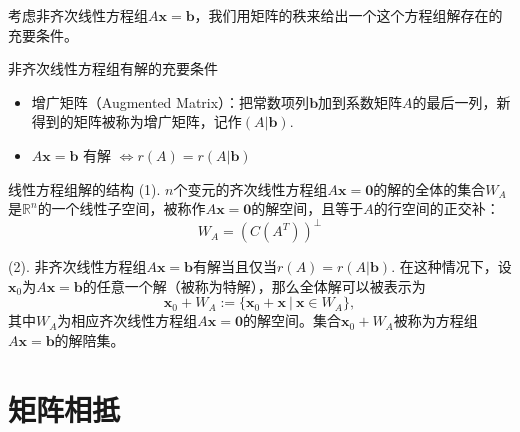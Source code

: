 
\begin{frame}

考虑非齐次线性方程组$A\mathbf{x} = \mathbf{b}$，我们用矩阵的秩来给出一个这个方程组解存在的充要条件。

\pause

\begin{block}{非齐次线性方程组有解的充要条件}
\begin{itemize}
\item 增广矩阵（Augmented Matrix）：把常数项列$\mathbf{b}$加到系数矩阵$A$的最后一列，新得到的矩阵被称为增广矩阵，记作$(A | \mathbf{b})$.
\item $A\mathbf{x} = \mathbf{b} \text{ 有解 } \Longleftrightarrow r(A) = r(A | \mathbf{b})$
\end{itemize}
\end{block}

\end{frame}


\begin{frame}

\begin{block}{线性方程组解的结构}
(1). $n$个变元的齐次线性方程组$A\mathbf{x} = \mathbf{0}$的解的全体的集合$W_A$是$\mathbb{R}^n$的一个线性子空间，被称作$A\mathbf{x} = \mathbf{0}$的解空间，且等于$A$的行空间的正交补：
\[W_A = (C(A^T))^{\perp}\]

\vspace{1em}
\pause

(2). 非齐次线性方程组$A\mathbf{x} = \mathbf{b}$有解当且仅当$r(A) = r(A | \mathbf{b})$. 在这种情况下，设$\mathbf{x}_0$为$A\mathbf{x} = \mathbf{b}$的任意一个解（被称为特解），那么全体解可以被表示为
\[\mathbf{x}_0 + W_A := \{ \mathbf{x}_0 + \mathbf{x} \ |\ \mathbf{x} \in W_A \},\]
其中$W_A$为相应齐次线性方程组$A\mathbf{x} = \mathbf{0}$的解空间。集合$\mathbf{x}_0 + W_A$被称为方程组$A\mathbf{x} = \mathbf{b}$的解陪集。
\end{block}

\end{frame}


\section{矩阵相抵}


